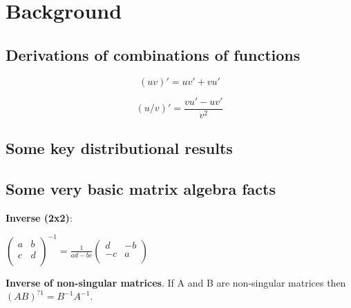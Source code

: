



\section{Background}

\subsection{Derivations of combinations of functions}

\begin{equation}
  (uv)' = uv' + vu'
\end{equation}

\begin{equation}
(u/v)' = 	\frac{vu' - uv'}{v^2}
\end{equation}


\subsection{Some key distributional results}


\subsection{Some very basic matrix algebra facts}

\textbf{Inverse (2x2)}: 

$\begin{pmatrix}
a & b \\
c & d\\
\end{pmatrix}^{-1}
= \frac{1}{ad-bc} 
\begin{pmatrix}
d & -b \\
-c & a\\
\end{pmatrix}$


\textbf{Inverse of non-singular matrices}. 
If A and B are non-singular matrices then $(AB)^{?1} = B^{-1}A^{-1}$.

